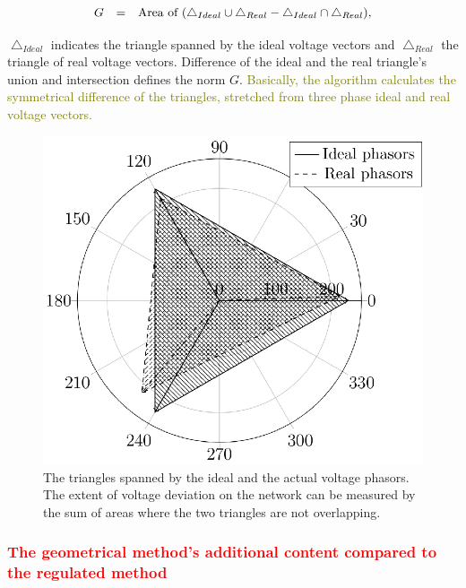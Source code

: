             \begin{equation}
                \begin{array}{rcl}
                       G&=&\textnormal{Area of }(\bigtriangleup_{Ideal}\cup\bigtriangleup_{Real}-\bigtriangleup_{Ideal}\cap\bigtriangleup_{Real}),
                \end{array}
                \label{equ:geom}
            \end{equation}

            $\bigtriangleup_{Ideal}$ indicates the triangle spanned by the ideal voltage vectors and $\bigtriangleup_{Real}$ the triangle of real voltage vectors. Difference of the ideal and the real triangle's union and intersection defines the norm $G$. \textcolor{olive}{Basically, the algorithm calculates the symmetrical difference of the triangles, stretched from three phase ideal and real voltage vectors.}

            \begin{figure}[!ht]
           \centering
           \includegraphics[scale=0.95]{Unblance_EPS_Pics/UnbalRedComp_JCP-figure1.eps}
           \caption{The triangles spanned by the ideal and the actual voltage phasors. The extent of voltage deviation on the network can be measured by the sum of areas where the two triangles are not overlapping.}
           \label{fig:threephase}
            \end{figure}

            \subsubsection{\textcolor{red}{The geometrical method's additional content compared to the regulated method}}

